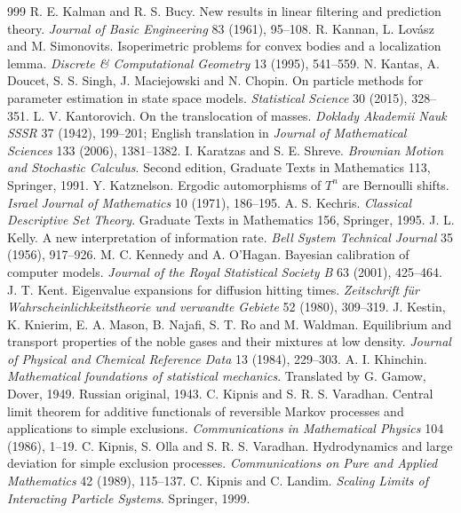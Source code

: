 \begin{thebibliography}{999}
 R. E. Kalman and R. S. Bucy. New results in linear filtering and prediction theory. \emph{Journal of Basic Engineering} 83 (1961), 95--108.
 R. Kannan, L. Lov\'asz and M. Simonovits. Isoperimetric problems for convex bodies and a localization lemma. \emph{Discrete \& Computational Geometry} 13 (1995), 541--559.
 N. Kantas, A. Doucet, S. S. Singh, J. Maciejowski and N. Chopin. On particle methods for parameter estimation in state space models. \emph{Statistical Science} 30 (2015), 328--351.
 L. V. Kantorovich. On the translocation of masses. \emph{Doklady Akademii Nauk SSSR} 37 (1942), 199--201; English translation in \emph{Journal of Mathematical Sciences} 133 (2006), 1381--1382.
 I. Karatzas and S. E. Shreve. \emph{Brownian Motion and Stochastic Calculus}. Second edition, Graduate Texts in Mathematics 113, Springer, 1991.
 Y. Katznelson. Ergodic automorphisms of $T^n$ are Bernoulli shifts. \emph{Israel Journal of Mathematics} 10 (1971), 186--195.
 A. S. Kechris. \emph{Classical Descriptive Set Theory}. Graduate Texts in Mathematics 156, Springer, 1995.
 J. L. Kelly. A new interpretation of information rate. \emph{Bell System Technical Journal} 35 (1956), 917--926.
 M. C. Kennedy and A. O'Hagan. Bayesian calibration of computer models. \emph{Journal of the Royal Statistical Society B} 63 (2001), 425--464.
 J. T. Kent. Eigenvalue expansions for diffusion hitting times. \emph{Zeitschrift f\"ur Wahrscheinlichkeitstheorie und verwandte Gebiete} 52 (1980), 309--319.
 J. Kestin, K. Knierim, E. A. Mason, B. Najafi, S. T. Ro and M. Waldman. Equilibrium and transport properties of the noble gases and their mixtures at low density. \emph{Journal of Physical and Chemical Reference Data} 13 (1984), 229--303.
 A. I. Khinchin. \emph{Mathematical foundations of statistical mechanics}. Translated by G. Gamow, Dover, 1949. Russian original, 1943.
 C. Kipnis and S. R. S. Varadhan. Central limit theorem for additive functionals of reversible Markov processes and applications to simple exclusions. \emph{Communications in Mathematical Physics} 104 (1986), 1--19.
 C. Kipnis, S. Olla and S. R. S. Varadhan. Hydrodynamics and large deviation for simple exclusion processes. \emph{Communications on Pure and Applied Mathematics} 42 (1989), 115--137.
 C. Kipnis and C. Landim. \emph{Scaling Limits of Interacting Particle Systems}. Springer, 1999.

\end{thebibliography}
